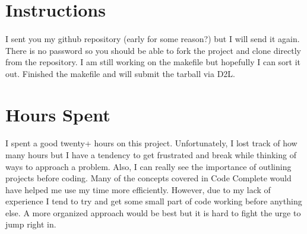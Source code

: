 \documentclass[11pt]{article}
\begin{document}
\section{Instructions}
\paragraph{} I sent you my github repository (early for some reason?) but I will send it again. There is no password so you should be able to fork the project and clone directly from the repository. I am still working on the makefile but hopefully I can sort it out. Finished the makefile and will submit the tarball via D2L.

\section{Hours Spent}
\paragraph{} I spent a good twenty+ hours on this project. Unfortunately, I lost track of how many hours but I have a tendency to get frustrated and break while thinking of ways to approach a problem. Also, I can really see the importance of outlining projects before coding. Many of the concepts covered in Code Complete would have helped me use my time more efficiently. However, due to my lack of experience I tend to try and get some small part of code working before anything else. A more organized approach would be best but it is hard to fight the urge to jump right in.
\end{document}
